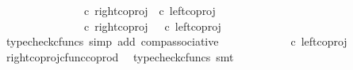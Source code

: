 \begin{isabellebody}
\ \ \isamarkupfalse%
{\isacharminus}{\kern0pt}\ \isanewline
\ \ \ \ \isamarkupfalse%
\ {\isachardoublequoteopen}{\isasymlangle}{\isasymt}{\isacharcomma}{\kern0pt}{\isasymt}{\isasymrangle}\ {\isasymamalg}\ {\isasymlangle}{\isasymt}{\isacharcomma}{\kern0pt}{\isasymf}{\isasymrangle}\ {\isasymamalg}\ {\isasymlangle}{\isasymf}{\isacharcomma}{\kern0pt}{\isasymt}{\isasymrangle}\ {\isasymcirc}\isactrlsub c\ {\isacharparenleft}{\kern0pt}right{\isacharunderscore}{\kern0pt}coproj\ {\isasymone}\ {\isacharparenleft}{\kern0pt}{\isasymone}{\isasymCoprod}{\isasymone}{\isacharparenright}{\kern0pt}{\isasymcirc}\isactrlsub c\ left{\isacharunderscore}{\kern0pt}coproj\ {\isasymone}\ {\isasymone}{\isacharparenright}{\kern0pt}\ {\isacharequal}{\kern0pt}\ \isanewline
\ \ \ \ \ \ \ \ \ \ {\isacharparenleft}{\kern0pt}{\isasymlangle}{\isasymt}{\isacharcomma}{\kern0pt}{\isasymt}{\isasymrangle}\ {\isasymamalg}\ {\isasymlangle}{\isasymt}{\isacharcomma}{\kern0pt}{\isasymf}{\isasymrangle}\ {\isasymamalg}\ {\isasymlangle}{\isasymf}{\isacharcomma}{\kern0pt}{\isasymt}{\isasymrangle}\ {\isasymcirc}\isactrlsub c\ right{\isacharunderscore}{\kern0pt}coproj\ {\isasymone}\ {\isacharparenleft}{\kern0pt}{\isasymone}{\isasymCoprod}{\isasymone}{\isacharparenright}{\kern0pt}\ {\isacharparenright}{\kern0pt}{\isasymcirc}\isactrlsub c\ left{\isacharunderscore}{\kern0pt}coproj\ {\isasymone}\ {\isasymone}{\isachardoublequoteclose}\isanewline
\ \ \ \ \ \ \isamarkupfalse%
\ {\isacharparenleft}{\kern0pt}typecheck{\isacharunderscore}{\kern0pt}cfuncs{\isacharcomma}{\kern0pt}\ simp\ add{\isacharcolon}{\kern0pt}\ comp{\isacharunderscore}{\kern0pt}associative{}{\isacharparenright}{\kern0pt}\isanewline
\ \ \ \ \isamarkupfalse%
\ \isamarkupfalse%
\ {\isachardoublequoteopen}{\isachardot}{\kern0pt}{\isachardot}{\kern0pt}{\isachardot}{\kern0pt}\ {\isacharequal}{\kern0pt}\ {\isasymlangle}{\isasymt}{\isacharcomma}{\kern0pt}{\isasymf}{\isasymrangle}\ {\isasymamalg}\ {\isasymlangle}{\isasymf}{\isacharcomma}{\kern0pt}{\isasymt}{\isasymrangle}\ {\isasymcirc}\isactrlsub c\ left{\isacharunderscore}{\kern0pt}coproj\ {\isasymone}\ {\isasymone}{\isachardoublequoteclose}\isanewline
\ \ \ \ \ \ \isamarkupfalse%
\ right{\isacharunderscore}{\kern0pt}coproj{\isacharunderscore}{\kern0pt}cfunc{\isacharunderscore}{\kern0pt}coprod\ \isamarkupfalse%
\ {\isacharparenleft}{\kern0pt}typecheck{\isacharunderscore}{\kern0pt}cfuncs{\isacharcomma}{\kern0pt}\ smt{\isacharparenright}{\kern0pt}\isanewline
\ \ \ \ \isamarkupfalse%

\end{isabellebody}
